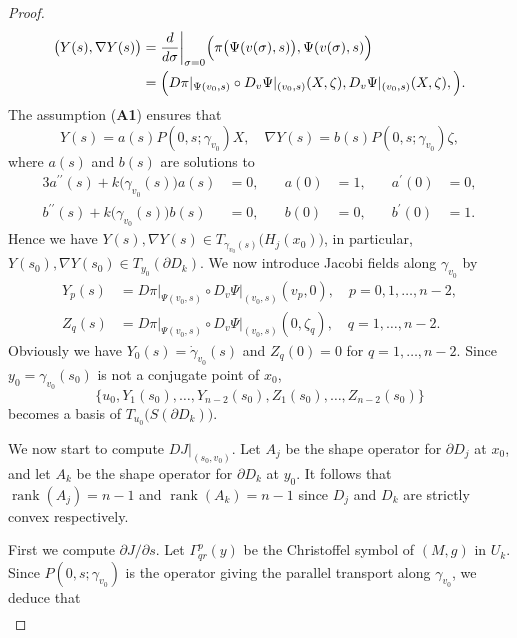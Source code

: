 \documentclass[a4paper,11pt,reqno]{amsart}
\numberwithin{equation}{section}
\theoremstyle{definition}
\theoremstyle{remark}
\begin{document}
\begin{proof}
%
%
\begin{align*}
  \bigl(Y(s),\nabla{Y(s)}\bigr)
& =
  \frac{d}{d\sigma}\bigg\vert_{\sigma=0}
  \Bigl(
  \pi\bigl(\Psi(v(\sigma),s)\bigr), \Psi(v(\sigma),s)
  \Bigr)
\\
& =
  \Bigl(
  D\pi\vert_{\Psi(v_0,s)}
  \circ
  D_v\Psi\vert_{(v_0,s)}(X,\zeta),
  D_v\Psi\vert_{(v_0,s)}(X,\zeta),
  \Bigr). 
\end{align*}
%
%
The assumption ({\bf A1}) ensures that 
%
%
$$
Y(s)
=
a(s)P(0,s;\gamma_{v_0})X,
\quad
\nabla{Y}(s)
=
b(s)P(0,s;\gamma_{v_0})\zeta,
$$
%
%
where $a(s)$ and $b(s)$ are solutions to 
%
%
\begin{alignat*}{3}
  a^{\prime\prime}(s)+k\bigl(\gamma_{v_0}(s)\bigr)a(s)
& =
  0,
& \quad
  a(0)
& =
  1,
& \quad
  a^\prime(0) 
& =
  0,
\\
  b^{\prime\prime}(s)+k\bigl(\gamma_{v_0}(s)\bigr)b(s)
& =
  0,
& \quad
  b(0)
& =
  0,
& \quad
  b^\prime(0) 
& =
  1. 
\end{alignat*}
%
%
Hence we have $Y(s), \nabla{Y(s)} \in T_{\gamma_{v_0}(s)}\bigl(H_j(x_0)\bigr)$, 
in particular, $Y(s_0), \nabla{Y(s_0)} \in T_{y_0}(\partial{D_k})$. 
We now introduce Jacobi fields along $\gamma_{v_0}$ by 
%
%
\begin{align*}
  Y_p(s)
& =
  D\pi\vert_{\Psi(v_0,s)}{\circ}D_v\Psi\vert_{(v_0,s)}(v_p,0),
  \quad
  p=0,1,\dotsc,n-2,
\\
  Z_q(s)
& =
  D\pi\vert_{\Psi(v_0,s)}{\circ}D_v\Psi\vert_{(v_0,s)}(0,\zeta_q),
  \quad
  q=1,\dotsc,n-2. 
\end{align*}
%
%
Obviously we have $Y_0(s)=\dot{\gamma}_{v_0}(s)$ and $Z_q(0)=0$ for $q=1,\dotsc,n-2$. 
Since $y_0=\gamma_{v_0}(s_0)$ is not a conjugate point of $x_0$, 
%
%
$$
\{u_0,Y_1(s_0),\dotsc,Y_{n-2}(s_0),Z_1(s_0),\dotsc,Z_{n-2}(s_0)\}
$$
%
%
becomes a basis of $T_{u_0}\bigl(S(\partial{D_k})\bigr)$.
%
%
\par
%
%
We now start to compute $DJ\vert_{(s_0,v_0)}$. 
Let $A_j$ be the shape operator for $\partial{D_j}$ at $x_0$, 
and let $A_k$ be the shape operator for $\partial{D_k}$ at $y_0$. 
It follows that $\operatorname{rank}(A_j)=n-1$ and 
$\operatorname{rank}(A_k)=n-1$ since $D_j$ and $D_k$ are strictly convex respectively. 
%
%
\par
%
%
First we compute $\partial J/\partial s$. 
Let $\Gamma^p_{qr}(y)$ be the Christoffel symbol of $(M,g)$ in $U_k$. 
Since $P(0,s;\gamma_{v_0})$ is the operator giving the parallel transport along $\gamma_{v_0}$, 
we deduce that 
%
%
\begin{align*}

\end{align*}
\end{proof}
\end{document}

